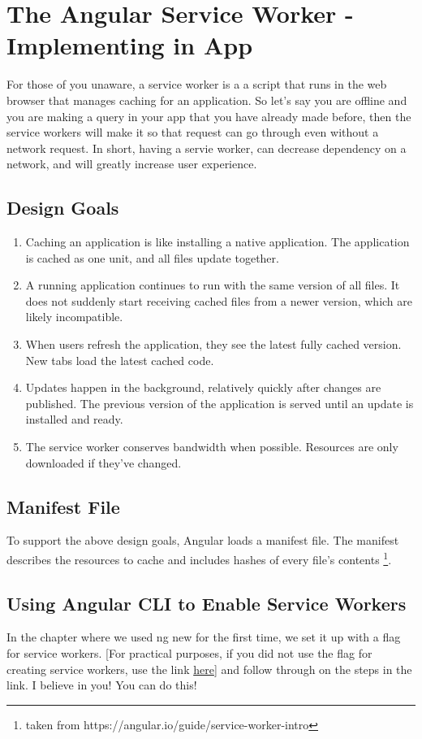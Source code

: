 \chapter{ The Angular Service Worker - Implementing in App }

For those of you unaware, a service worker is a a script that runs in the web
browser that manages caching for an application. So let's say you are offline
and you are making a query in your app that you have already made before, then
the service workers will make it so that request can go through even without a
network request. In short, having a servie worker, can decrease dependency on a
network, and will greatly increase user experience.

\section{ Design Goals }
\begin{enumerate}
  \item Caching an application is like installing a native application.
  The application is cached as one unit, and all files update together.
  \item A running application continues to run with the same version of all
  files. It does not suddenly start receiving cached files from a newer version,
  which are likely incompatible.
  \item When users refresh the application, they see the latest fully cached
  version. New tabs load the latest cached code.
  \item Updates happen in the background, relatively quickly after changes are
  published. The previous version of the application is served until an update
  is installed and ready.
  \item The service worker conserves bandwidth when possible. Resources are only
  downloaded if they've changed.
\end{enumerate}

\section{ Manifest File }
To support the above design goals, Angular loads a manifest file. The manifest
describes the resources to cache and includes hashes of every file's contents
\footnote{taken from https://angular.io/guide/service-worker-intro}.

\section{ Using Angular CLI to Enable Service Workers }
In the chapter where we used ng new for the first time, we set it up with a flag
for service workers. [For practical purposes, if you did not use the flag for
creating service workers, use the link \href{https://angular.io/guide/service-worker-getting-started}{here}]
and follow through on the steps in the link. I believe in you! You can do this!

